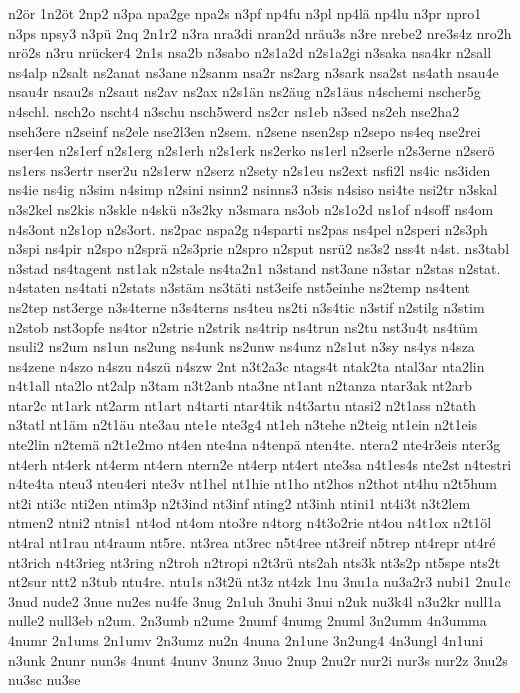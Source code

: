 {n2ör
1n2öt
2np2
n3pa
npa2ge
npa2s
n3pf
np4fu
n3pl
np4lä
np4lu
n3pr
npro1
n3ps
npsy3
n3pü
2nq
2n1r2
n3ra
nra3di
nran2d
nräu3s
n3re
nrebe2
nre3s4z
nro2h
nrö2s
n3ru
nrücker4
2n1s
nsa2b
n3sabo
n2s1a2d
n2s1a2gi
n3saka
nsa4kr
n2sall
ns4alp
n2salt
ns2anat
ns3ane
n2sanm
nsa2r
ns2arg
n3sark
nsa2st
ns4ath
nsau4e
nsau4r
nsau2s
n2saut
ns2av
ns2ax
n2s1än
ns2äug
n2s1äus
n4schemi
nscher5g
n4schl.
nsch2o
nscht4
n3schu
nsch5werd
ns2cr
ns1eb
n3sed
ns2eh
nse2ha2
nseh3ere
n2seinf
ns2ele
nse2l3en
n2sem.
n2sene
nsen2sp
n2sepo
ns4eq
nse2rei
nser4en
n2s1erf
n2s1erg
n2s1erh
n2s1erk
ns2erko
ns1erl
n2serle
n2s3erne
n2serö
ns1ers
ns3ertr
nser2u
n2s1erw
n2serz
n2sety
n2s1eu
ns2ext
nsfi2l
ns4ic
ns3iden
ns4ie
ns4ig
n3sim
n4simp
n2sini
nsinn2
nsinns3
n3sis
n4siso
nsi4te
nsi2tr
n3skal
n3s2kel
ns2kis
n3skle
n4skü
n3s2ky
n3smara
ns3ob
n2s1o2d
ns1of
n4soff
ns4om
n4s3ont
n2s1op
n2s3ort.
ns2pac
nspa2g
n4sparti
ns2pas
ns4pel
n2speri
n2s3ph
n3spi
ns4pir
n2spo
n2sprä
n2s3prie
n2spro
n2sput
nsrü2
ns3s2
nss4t
n4st.
ns3tabl
n3stad
ns4tagent
nst1ak
n2stale
ns4ta2n1
n3stand
nst3ane
n3star
n2stas
n2stat.
n4staten
ns4tati
n2stats
n3stäm
ns3täti
nst3eife
nst5einhe
ns2temp
ns4tent
ns2tep
nst3erge
n3s4terne
n3s4terns
ns4teu
ns2ti
n3s4tic
n3stif
n2stilg
n3stim
n2stob
nst3opfe
ns4tor
n2strie
n2strik
ns4trip
ns4trun
ns2tu
nst3u4t
ns4tüm
nsuli2
ns2um
ns1un
ns2ung
ns4unk
ns2unw
ns4unz
n2s1ut
n3sy
ns4ys
n4sza
ns4zene
n4szo
n4szu
n4szü
n4szw
2nt
n3t2a3c
ntags4t
ntak2ta
ntal3ar
nta2lin
n4t1all
nta2lo
nt2alp
n3tam
n3t2anb
nta3ne
nt1ant
n2tanza
ntar3ak
nt2arb
ntar2c
nt1ark
nt2arm
nt1art
n4tarti
ntar4tik
n4t3artu
ntasi2
n2t1ass
n2tath
n3tatl
nt1äm
n2t1äu
nte3au
nte1e
nte3g4
nt1eh
n3tehe
n2teig
nt1ein
n2t1eis
nte2lin
n2temä
n2t1e2mo
nt4en
nte4na
n4tenpä
nten4te.
ntera2
nte4r3eis
nter3g
nt4erh
nt4erk
nt4erm
nt4ern
ntern2e
nt4erp
nt4ert
nte3sa
n4t1es4s
nte2st
n4testri
n4te4ta
nteu3
nteu4eri
nte3v
nt1hel
nt1hie
nt1ho
nt2hos
n2thot
nt4hu
n2t5hum
nt2i
nti3c
nti2en
ntim3p
n2t3ind
nt3inf
nting2
nt3inh
ntini1
nt4i3t
n3t2lem
ntmen2
ntni2
ntnis1
nt4od
nt4om
nto3re
n4torg
n4t3o2rie
nt4ou
n4t1ox
n2t1öl
nt4ral
nt1rau
nt4raum
nt5re.
nt3rea
nt3rec
n5t4ree
nt3reif
n5trep
nt4repr
nt4ré
nt3rich
n4t3rieg
nt3ring
n2troh
n2tropi
n2t3rü
nts2ah
nts3k
nt3s2p
nt5spe
nts2t
nt2sur
ntt2
n3tub
ntu4re.
ntu1s
n3t2ü
nt3z
nt4zk
1nu
3nu1a
nu3a2r3
nubi1
2nu1c
3nud
nude2
3nue
nu2es
nu4fe
3nug
2n1uh
3nuhi
3nui
n2uk
nu3k4l
n3u2kr
null1a
nulle2
null3eb
n2um.
2n3umb
n2ume
2numf
4numg
2numl
3n2umm
4n3umma
4numr
2n1ums
2n1umv
2n3umz
nu2n
4nuna
2n1une
3n2ung4
4n3ungl
4n1uni
n3unk
2nunr
nun3s
4nunt
4nunv
3nunz
3nuo
2nup
2nu2r
nur2i
nur3s
nur2z
3nu2s
nu3sc
nu3se
}
